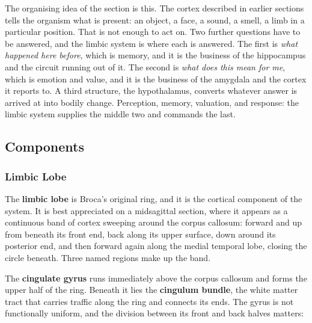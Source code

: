 \documentclass[11pt]{article}
\begin{document}
The organising idea of the section is this. The cortex described in earlier sections tells the organism what is present: an object, a face, a sound, a smell, a limb in a particular position. That is not enough to act on. Two further questions have to be answered, and the limbic system is where each is answered. The first is \textit{what happened here before}, which is memory, and it is the business of the hippocampus and the circuit running out of it. The second is \textit{what does this mean for me}, which is emotion and value, and it is the business of the amygdala and the cortex it reports to. A third structure, the hypothalamus, converts whatever answer is arrived at into bodily change. Perception, memory, valuation, and response: the limbic system supplies the middle two and commands the last.

\subsection{Components}

\subsubsection{Limbic Lobe}

The \textbf{limbic lobe} is Broca's original ring, and it is the cortical component of the system. It is best appreciated on a midsagittal section, where it appears as a continuous band of cortex sweeping around the corpus callosum: forward and up from beneath its front end, back along its upper surface, down around its posterior end, and then forward again along the medial temporal lobe, closing the circle beneath. Three named regions make up the band.

The \textbf{cingulate gyrus} runs immediately above the corpus callosum and forms the upper half of the ring. Beneath it lies the \textbf{cingulum bundle}, the white matter tract that carries traffic along the ring and connects its ends. The gyrus is not functionally uniform, and the division between its front and back halves matters:
\end{document}
